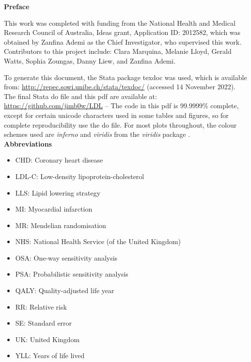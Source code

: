 \documentclass[11pt]{article}
\begin{document}
\pagebreak
\tableofcontents
\pagebreak
\listoftables
\pagebreak
\listoffigures
\pagebreak

\pagebreak
\Large
\noindent
\textbf{Preface}
\normalsize

This work was completed with funding from the National Health and Medical Research Council of Australia, Ideas grant, 
Application ID: 2012582, which was obtained by Zanfina Ademi as the Chief Investigator, who supervised this work. Contributors 
to this project include: Clara Marquina, Melanie Lloyd, Gerald Watts, Sophia Zoungas, Danny Liew, and Zanfina Ademi. 

To generate this document, the Stata package texdoc \cite{Jann2016Stata} was used, which is 
available from: \color{blue} \url{http://repec.sowi.unibe.ch/stata/texdoc/} \color{black} (accessed 14 November 2022). 
The final Stata do file and this pdf are available at: \color{blue} \url{https://github.com/jimb0w/LDL} \color{black} -- 
The code in this pdf is 99.9999\% complete, except for certain unicode characters used in some tables and figures, 
so for complete reproducibility use the do file. 
For most plots throughout, the colour schemes used are \emph{inferno} and \emph{viridis} from the
\emph{viridis} package \cite{GarnierR2021}. \\

\pagebreak
\Large
\noindent
\textbf{Abbreviations}
\normalsize

\begin{itemize}
\item CHD: Coronary heart disease
\item LDL-C: Low-density lipoprotein-cholesterol
\item LLS: Lipid lowering strategy
\item MI: Myocardial infarction
\item MR: Mendelian randomisation
\item NHS: National Health Service (of the United Kingdom)
\item OSA: One-way sensitivity analysis
\item PSA: Probabilistic sensitivity analysis
\item QALY: Quality-adjusted life year
\item RR: Relative risk
\item SE: Standard error
\item UK: United Kingdom
\item YLL: Years of life lived
\end{itemize}
\end{document}
